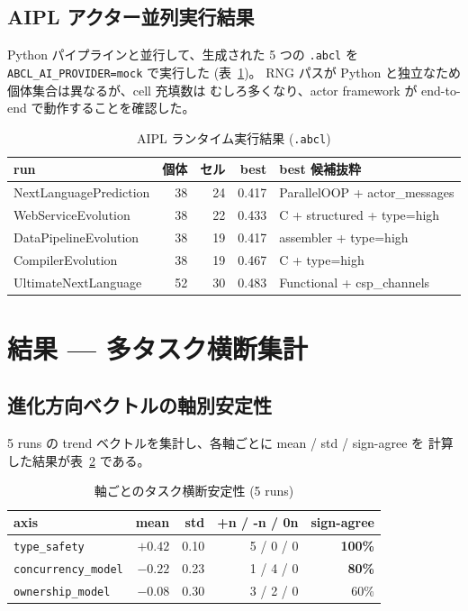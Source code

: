 \documentclass[a4paper,11pt]{article}
\begin{document}
\subsection{AIPL アクター並列実行結果}

Python パイプラインと並行して、生成された 5 つの \texttt{.abcl} を
\texttt{ABCL\_AI\_PROVIDER=mock} で実行した (表~\ref{tab:abcl_results})。
RNG パスが Python と独立なため個体集合は異なるが、cell 充填数は
むしろ多くなり、actor framework が end-to-end で動作することを確認した。

\begin{table}[h]
\centering
\caption{AIPL ランタイム実行結果 (\texttt{.abcl})}
\label{tab:abcl_results}
\small
\begin{tabular}{lrrrl}
\toprule
run & 個体 & セル & best & best 候補抜粋 \\
\midrule
NextLanguagePrediction & 38 & 24 & 0.417 & ParallelOOP + actor\_messages \\
WebServiceEvolution    & 38 & 22 & 0.433 & C + structured + type=high \\
DataPipelineEvolution  & 38 & 19 & 0.417 & assembler + type=high \\
CompilerEvolution      & 38 & 19 & 0.467 & C + type=high \\
UltimateNextLanguage   & 52 & 30 & 0.483 & Functional + csp\_channels \\
\bottomrule
\end{tabular}
\end{table}

\section{結果 — 多タスク横断集計}

\subsection{進化方向ベクトルの軸別安定性}

5 runs の trend ベクトルを集計し、各軸ごとに mean / std / sign-agree を
計算した結果が表~\ref{tab:trend_stability} である。

\begin{table}[h]
\centering
\caption{軸ごとのタスク横断安定性 (5 runs)}
\label{tab:trend_stability}
\small
\begin{tabular}{lrrrr}
\toprule
axis & mean & std & +n / -n / 0n & sign-agree \\
\midrule
\texttt{type\_safety}        & \(+0.42\) & 0.10 & 5 / 0 / 0 & \textbf{100\%} \\
\texttt{concurrency\_model}  & \(-0.22\) & 0.23 & 1 / 4 / 0 & \textbf{80\%} \\
\texttt{ownership\_model}    & \(-0.08\) & 0.30 & 3 / 2 / 0 & 60\% \\
\bottomrule
\end{tabular}
\end{table}
\end{document}
